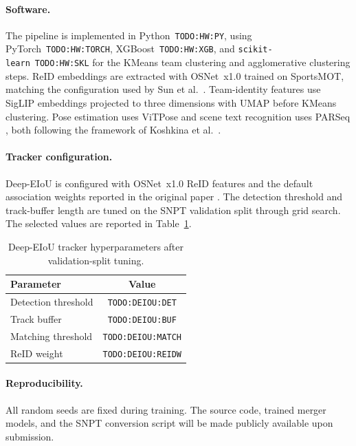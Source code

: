 \paragraph{Software.} The pipeline is implemented in Python~\texttt{TODO:HW:PY}, using PyTorch~\texttt{TODO:HW:TORCH}, XGBoost~\texttt{TODO:HW:XGB}, and \texttt{scikit-learn}~\texttt{TODO:HW:SKL} for the KMeans team clustering and agglomerative clustering steps. ReID embeddings are extracted with OSNet~x1.0 \cite{osnet} trained on SportsMOT, matching the configuration used by Sun et al.\ \cite{gta}. Team-identity features use SigLIP embeddings projected to three dimensions with UMAP before KMeans clustering. Pose estimation uses ViTPose \cite{vitpose} and scene text recognition uses PARSeq \cite{parseq}, both following the framework of Koshkina et al.\ \cite{jersey-prediction}.

\paragraph{Tracker configuration.} Deep-EIoU is configured with OSNet~x1.0 ReID features and the default association weights reported in the original paper \cite{deep-eiou}. The detection threshold and track-buffer length are tuned on the SNPT validation split through grid search. The selected values are reported in Table~\ref{tab:deepeiou_hparams}.

\begin{table}[H]
\centering
\begin{tabular}{lc}
\toprule
\textbf{Parameter} & \textbf{Value} \\
\midrule
Detection threshold      & \texttt{TODO:DEIOU:DET}   \\
Track buffer             & \texttt{TODO:DEIOU:BUF}   \\
Matching threshold       & \texttt{TODO:DEIOU:MATCH} \\
ReID weight              & \texttt{TODO:DEIOU:REIDW} \\
\bottomrule
\end{tabular}
\caption{Deep-EIoU tracker hyperparameters after validation-split tuning.}
\label{tab:deepeiou_hparams}
\end{table}

\paragraph{Reproducibility.} All random seeds are fixed during training. The source code, trained merger models, and the SNPT conversion script will be made publicly available upon submission.

